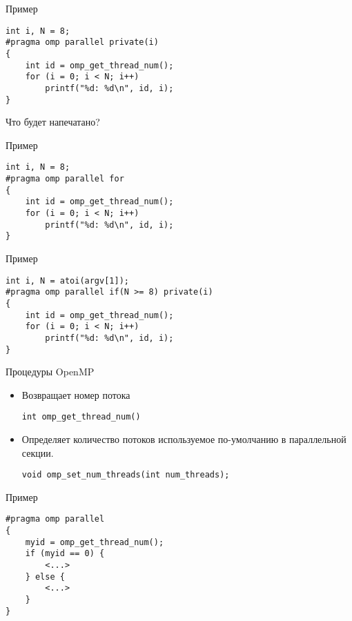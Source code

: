\begin{frame}[fragile]{Пример}
\begin{lstlisting}
int i, N = 8;
#pragma omp parallel private(i)
{
    int id = omp_get_thread_num();
    for (i = 0; i < N; i++)
        printf("%d: %d\n", id, i);
}
\end{lstlisting}

\pause

Что будет напечатано?
\end{frame}

\begin{frame}[fragile]{Пример}
\begin{lstlisting}
int i, N = 8;
#pragma omp parallel for
{
    int id = omp_get_thread_num();
    for (i = 0; i < N; i++)
        printf("%d: %d\n", id, i);
}
\end{lstlisting}
\end{frame}

\begin{frame}[fragile]{Пример}
\begin{lstlisting}
int i, N = atoi(argv[1]);
#pragma omp parallel if(N >= 8) private(i)
{
    int id = omp_get_thread_num();
    for (i = 0; i < N; i++)
        printf("%d: %d\n", id, i);
}
\end{lstlisting}
\end{frame}

\begin{frame}[fragile]{Процедуры OpenMP}

\begin{itemize}
    \item Возвращает номер потока
    \begin{lstlisting}
int omp_get_thread_num()
    \end{lstlisting}

    \item Определяет количество потоков используемое по-умолчанию в параллельной секции.
    \begin{lstlisting}
void omp_set_num_threads(int num_threads);
    \end{lstlisting}
\end{itemize}

\end{frame}

\begin{frame}[fragile]{Пример}

\begin{lstlisting}
#pragma omp parallel
{
    myid = omp_get_thread_num();
    if (myid == 0) {
        <...>
    } else {
        <...>
    }
}
\end{lstlisting}

\end{frame}

